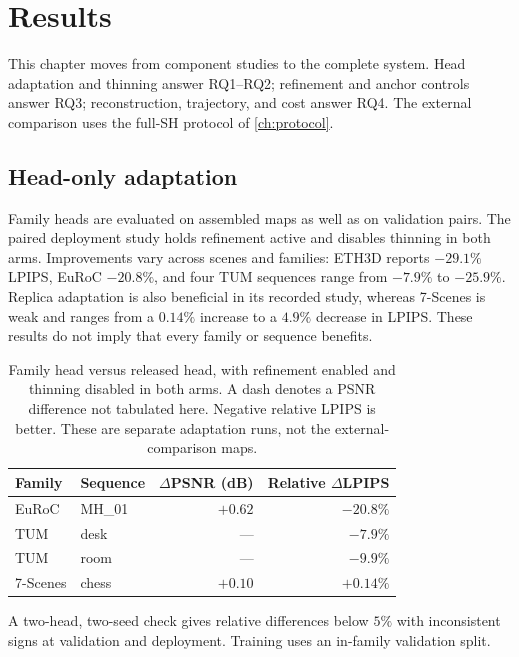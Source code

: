 \chapter{Results}
\label{ch:results}

This chapter moves from component studies to the complete system.
Head adaptation and thinning answer RQ1--RQ2; refinement and anchor controls
answer RQ3; reconstruction, trajectory, and cost answer RQ4. The external
comparison uses the full-SH protocol of \cref{ch:protocol}.

\section{Head-only adaptation}
\label{sec:exp:head}

Family heads are evaluated on assembled maps as well as on validation pairs.
The paired deployment study holds refinement active and disables thinning
in both arms. Improvements vary across scenes and families: ETH3D reports
$-29.1\%$ LPIPS, EuRoC $-20.8\%$, and four TUM sequences range from
$-7.9\%$ to $-25.9\%$. Replica adaptation is also beneficial in its
recorded study, whereas 7-Scenes is weak and ranges from a $0.14\%$ increase
to a $4.9\%$ decrease in LPIPS. These results do not imply that every
family or sequence benefits.

\begin{table}[t]
\centering\small
\begin{tabular}{@{}llrr@{}}
\toprule
Family & Sequence & $\Delta$PSNR (dB) & Relative $\Delta$LPIPS \\
\midrule
EuRoC & MH\_01 & $+0.62$ & $-20.8\%$ \\
TUM & desk & --- & $-7.9\%$ \\
TUM & room & --- & $-9.9\%$ \\
7-Scenes & chess & $+0.10$ & $+0.14\%$ \\
\bottomrule
\end{tabular}
\caption[Paired head-adaptation examples]{Family head versus released head,
with refinement enabled and thinning disabled in both arms. A dash denotes
a PSNR difference not tabulated here. Negative relative LPIPS is better.
These are separate adaptation runs, not the external-comparison maps.}
\label{tab:head}
\end{table}

A two-head, two-seed check gives relative differences below $5\%$ with
inconsistent signs at validation and deployment. Training uses an in-family
validation split.

